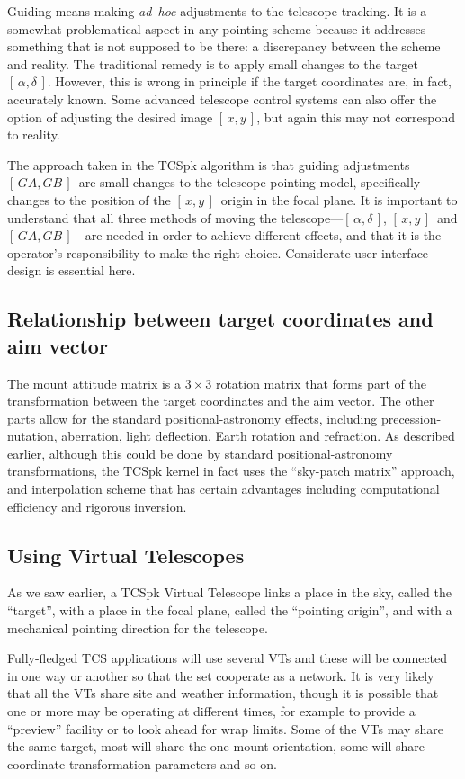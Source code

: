 \documentclass[12pt,fleqn,twoside]{article}
\renewcommand{\_}{{\tt\char'137}}     %
\newcommand{\radec}     {$[\,\alpha,\delta\,]$}
\newcommand{\xy}        {$[\,x,y\,]$}
\newcommand{\gagb}       {$[\,GA,GB\,]$}
\begin{document}
Guiding means making {\it ad~hoc}\/ adjustments to the telescope
tracking. It is a somewhat problematical aspect in any pointing
scheme because it addresses something that is not supposed to be
there: a discrepancy between the scheme and reality. The
traditional remedy is to apply small changes to the target \radec.
However, this is wrong in principle if the target coordinates
are, in fact, accurately known.  Some advanced telescope control
systems can also offer the option of adjusting the desired image
\xy, but again this may not correspond to reality.

The approach taken in the TCSpk algorithm is that guiding
adjustments \gagb\ are small changes to the telescope pointing
model, specifically changes to the position of the \xy\ origin in
the focal plane. It is important to understand that all three
methods of moving the telescope---\radec, \xy\ and \gagb---are
needed in order to achieve different effects, and that it is the
operator's responsibility to make the right choice.  Considerate
user-interface design is essential here.

\subsection{Relationship between target coordinates and aim vector}
The mount attitude matrix is a $3\times3$ rotation
matrix that forms part of the
transformation between the target coordinates and the aim
vector.  The other parts allow for the standard
positional-astronomy effects, including precession-nutation,
aberration, light deflection, Earth rotation and refraction.
As described earlier,
although this could be done by standard positional-astronomy
transformations, the
TCSpk kernel in fact uses
the ``sky-patch matrix'' approach, and
interpolation scheme that has certain advantages
including computational efficiency and rigorous inversion.

\subsection{Using Virtual Telescopes}

As we saw earlier, a TCSpk Virtual Telescope links
a place in the sky, called the
``target'', with a place in the focal plane, called the ``pointing
origin'', and with a mechanical pointing direction for the telescope.

Fully-fledged TCS applications will use several VTs and these
will be connected in one way or another so that the set cooperate
as a network.  It is very likely that all the VTs share site and
weather information, though it is possible that one or more may be
operating at different times, for example to provide a ``preview''
facility or to look ahead for wrap limits.  Some of the VTs may
share the same target, most will share the one mount orientation,
some will share coordinate transformation parameters and so on.
\end{document}
